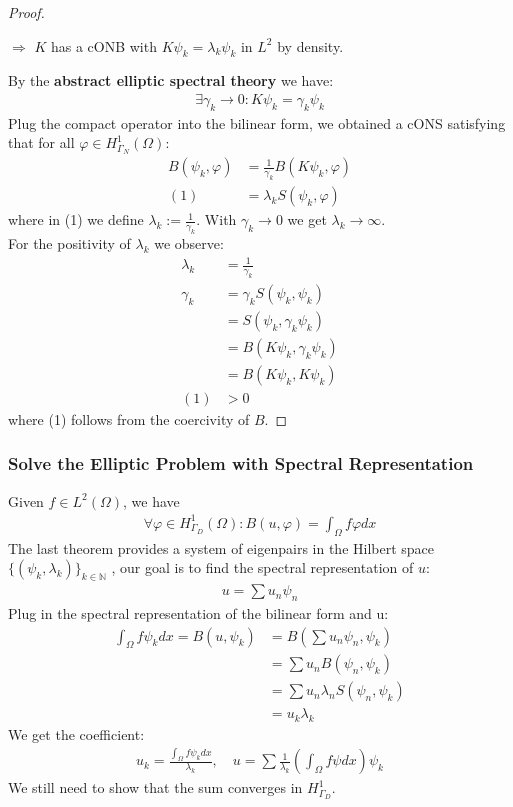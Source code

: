 \begin{proof}
\begin{itemize}
	$\Rightarrow$ $K$ has a cONB with $K \psi_k = \lambda_k \psi_k$ in $L^2$ by density.
\end{itemize}
By the \textbf{abstract elliptic spectral theory} we have:
\begin{align*}
	\exists \gamma_k \rightarrow 0: K\psi_k = \gamma_k \psi_k
\end{align*}
Plug the compact operator into the bilinear form, we obtained a cONS satisfying that for all $\varphi \in H^1_{\Gamma_N}(\Omega)$:
\begin{align*}
	B(\psi_k, \varphi) &= \frac{1}{\gamma_k} B(K\psi_k, \varphi)\\
	(1) &= \lambda_k S(\psi_k, \varphi)
\end{align*}
where in (1) we define $\lambda_k := \frac{1}{\gamma_k}$. With $\gamma_k \rightarrow 0$ we get $\lambda_k \rightarrow \infty$.\\
For the positivity of $\lambda_k$ we observe:
\begin{align*}
	\lambda_k &= \frac{1}{\gamma_k}\\
	\gamma_k &= \gamma_k S(\psi_k, \psi_k) \\
	&= S(\psi_k, \gamma_k \psi_k)\\
	&= B(K\psi_k, \gamma_k \psi_k)\\
	&= B(K \psi_k, K \psi_k)\\
	(1)&>0 
\end{align*}
where (1) follows from the coercivity of $B$.
\end{proof}


\subsubsection*{Solve the Elliptic Problem with Spectral Representation}
Given $f \in L^2(\Omega)$, we have
\begin{align*}
	\forall \varphi \in H^1_{\Gamma_D}(\Omega): B(u, \varphi) = \int_\Omega f \varphi dx
\end{align*}
The last theorem provides a system of eigenpairs in the Hilbert space $\{(\psi_k, \lambda_k)\}_{k \in \mathbb{N}}$ , our goal is to find the spectral representation of $u$:
\begin{align*}
	u = \sum u_n \psi_n
\end{align*}
Plug in the spectral representation of the bilinear form and u:
\begin{align*}
	\int_\Omega f\psi_k dx =B(u, \psi_k) &= B(\sum u_n \psi_n, \psi_k)\\
	&= \sum u_n B(\psi_n, \psi_k)\\
	&= \sum u_n \lambda_n S(\psi_n, \psi_k) \\
	&= u_k \lambda_k
\end{align*}
We get the coefficient:
\begin{align*}
	u_k = \frac{\int_\Omega f \psi_k dx}{\lambda_k}, \quad 
	u= \sum \frac{1}{\lambda_k}( \int_\Omega f \psi dx ) \psi_k
\end{align*}
We still need to show that the sum converges in $H^1_{\Gamma_D}$.

